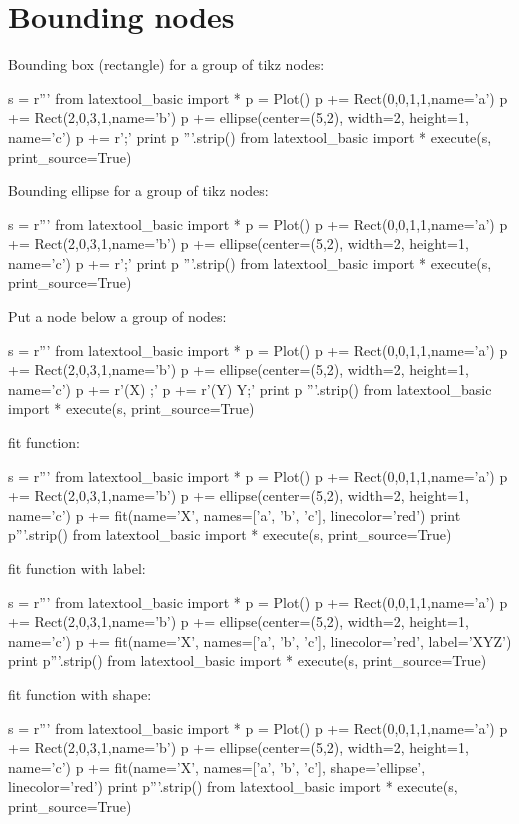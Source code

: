 \section{Bounding nodes}

Bounding box (rectangle) for a group of tikz nodes:
\begin{python}
s = r'''
from latextool_basic import *
p = Plot()
p += Rect(0,0,1,1,name='a')
p += Rect(2,0,3,1,name='b')
p += ellipse(center=(5,2), width=2, height=1, name='c')
p += r'\node [draw=black, fit=(a) (b) (c), line width=0.1cm, inner sep=0.0cm] {};'
print p
'''.strip()
from latextool_basic import *
execute(s, print_source=True)
\end{python}

Bounding ellipse for a group of tikz nodes:
\begin{python}
s = r'''
from latextool_basic import *
p = Plot()
p += Rect(0,0,1,1,name='a')
p += Rect(2,0,3,1,name='b')
p += ellipse(center=(5,2), width=2, height=1, name='c')
p += r'\node [ellipse, draw=black, fit=(a) (b) (c), line width=0.1cm, inner sep=0.0cm] {};'
print p
'''.strip()
from latextool_basic import *
execute(s, print_source=True)
\end{python}



Put a node below a group of nodes:
\begin{python}
s = r'''
from latextool_basic import *
p = Plot()
p += Rect(0,0,1,1,name='a')
p += Rect(2,0,3,1,name='b')
p += ellipse(center=(5,2), width=2, height=1, name='c')
p += r'\node [draw=black, fit=(a) (b) (c), inner sep=0.0cm, dashed] (X) {};'
p += r'\node [draw=black, rectangle, minimum width=1cm, below=1cm  of X, minimum height=1cm, distance=2cm] (Y) {Y};'
print p
'''.strip()
from latextool_basic import *
execute(s, print_source=True)
\end{python}

fit function:
\begin{python}
s = r'''
from latextool_basic import *
p = Plot()
p += Rect(0,0,1,1,name='a')
p += Rect(2,0,3,1,name='b')
p += ellipse(center=(5,2), width=2, height=1, name='c')
p += fit(name='X', names=['a', 'b', 'c'], linecolor='red')
print p'''.strip()
from latextool_basic import *
execute(s, print_source=True)
\end{python}

fit function with label:
\begin{python}
s = r'''
from latextool_basic import *
p = Plot()
p += Rect(0,0,1,1,name='a')
p += Rect(2,0,3,1,name='b')
p += ellipse(center=(5,2), width=2, height=1, name='c')
p += fit(name='X', names=['a', 'b', 'c'], linecolor='red', label='XYZ')
print p'''.strip()
from latextool_basic import *
execute(s, print_source=True)
\end{python}

fit function with shape:
\begin{python}
s = r'''
from latextool_basic import *
p = Plot()
p += Rect(0,0,1,1,name='a')
p += Rect(2,0,3,1,name='b')
p += ellipse(center=(5,2), width=2, height=1, name='c')
p += fit(name='X', names=['a', 'b', 'c'], shape='ellipse', linecolor='red')
print p'''.strip()
from latextool_basic import *
execute(s, print_source=True)
\end{python}
